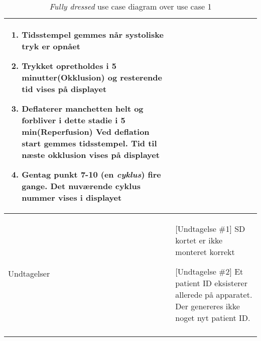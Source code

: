 \begin{center}
\begin{longtable}{ | p{} | p{}| }
\begin{enumerate}
				\item Tidsstempel gemmes når systoliske tryk er opnået
				\item Trykket opretholdes i 5 minutter(Okklusion) og resterende tid vises på displayet
				\item Deflaterer manchetten helt og forbliver i dette stadie i 5 min(Reperfusion) Ved deflation start gemmes tidsstempel. Tid til næste okklusion vises på displayet
				\item Gentag punkt 7-10 (en \textit{cyklus}) fire gange. Det nuværende cyklus nummer vises i displayet
			\end{enumerate} \\ 
			\hline
			Undtagelser & [Undtagelse \#1] SD kortet er ikke monteret korrekt
			
			[Undtagelse \#2] Et patient ID eksisterer allerede på apparatet. Der genereres ikke noget nyt patient ID. \\
			\hline
			\caption{\textit{Fully dressed} use case diagram over use case 1}
		\end{longtable}
		
	\end{center}